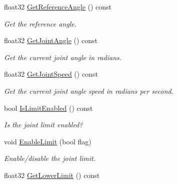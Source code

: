 \begin{DoxyCompactItemize}
float32 \hyperlink{classb2_revolute_joint_ae84b9659fe94f41f54f43d3f64ee0741}{Get\+Reference\+Angle} () const
\begin{DoxyCompactList}\small\item\em Get the reference angle. \end{DoxyCompactList}\item 
\mbox{\label{classb2_revolute_joint_a2a83b2276c71bf287771004838f2b507}} 
float32 \hyperlink{classb2_revolute_joint_a2a83b2276c71bf287771004838f2b507}{Get\+Joint\+Angle} () const
\begin{DoxyCompactList}\small\item\em Get the current joint angle in radians. \end{DoxyCompactList}\item 
\mbox{\label{classb2_revolute_joint_a631b7bd2c72b61f03b6efc605308092f}} 
float32 \hyperlink{classb2_revolute_joint_a631b7bd2c72b61f03b6efc605308092f}{Get\+Joint\+Speed} () const
\begin{DoxyCompactList}\small\item\em Get the current joint angle speed in radians per second. \end{DoxyCompactList}\item 
\mbox{\label{classb2_revolute_joint_a84ff9c4f82b3e7d27a4390164f81f3ab}} 
bool \hyperlink{classb2_revolute_joint_a84ff9c4f82b3e7d27a4390164f81f3ab}{Is\+Limit\+Enabled} () const
\begin{DoxyCompactList}\small\item\em Is the joint limit enabled? \end{DoxyCompactList}\item 
\mbox{\label{classb2_revolute_joint_a56bdfdd04e906e52d0258f6a481b9093}} 
void \hyperlink{classb2_revolute_joint_a56bdfdd04e906e52d0258f6a481b9093}{Enable\+Limit} (bool flag)
\begin{DoxyCompactList}\small\item\em Enable/disable the joint limit. \end{DoxyCompactList}\item 
\mbox{\label{classb2_revolute_joint_a1e34ad0cc3289d90bff8140c5d6261d2}} 
float32 \hyperlink{classb2_revolute_joint_a1e34ad0cc3289d90bff8140c5d6261d2}{Get\+Lower\+Limit} () const

\end{DoxyCompactItemize}
